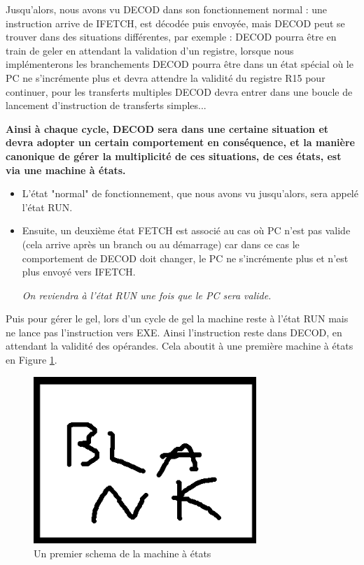 \documentclass{article}
\begin{document}
Jusqu'alors, nous avons vu DECOD dans son fonctionnement normal : une instruction arrive de IFETCH,
est décodée puis envoyée, mais DECOD peut se trouver dans des situations différentes, par exemple :
DECOD pourra être en train de geler en attendant la validation d'un registre,
lorsque nous implémenterons les branchements DECOD pourra être dans un état spécial où le PC ne s'incrémente
plus et devra attendre la validité du registre R15 pour continuer, pour les transferts multiples
DECOD devra entrer dans une boucle de lancement d'instruction de transferts simples...

\textbf{Ainsi à chaque cycle, DECOD sera dans une certaine situation et devra adopter un certain
comportement en conséquence, et la manière canonique de gérer la multiplicité de ces situations,
de ces états, est via une machine à états.}

\begin{itemize}
 \item L'état "normal" de fonctionnement, que nous avons vu jusqu'alors, sera appelé l'état RUN.
 \item Ensuite, un deuxième état FETCH est associé au cas où PC n'est pas valide
   (cela arrive après un branch ou au démarrage) car dans ce cas le comportement de DECOD doit changer,
   le PC ne s'incrémente plus et n'est plus envoyé vers IFETCH.

   \textit{On reviendra à l'état RUN une fois que le PC sera valide.}
\end{itemize}

Puis pour gérer le gel, lors d'un cycle de gel la machine reste à l'état RUN mais ne lance pas l'instruction
vers EXE. Ainsi l'instruction reste dans DECOD, en attendant la validité des opérandes.
Cela aboutit à une première machine à états en Figure \ref{mae_part}.

\begin{figure}[H]
\includegraphics[width=0.75\textwidth]{pics/blank.png}
\centering
\caption{Un premier schema de la machine à états}
\label{mae_part}
\end{figure}
\end{document}

